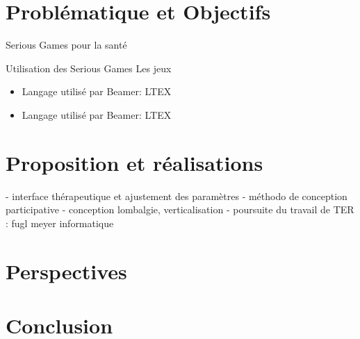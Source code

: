 \documentclass{beamer}
\begin{document}
\section{Problématique et Objectifs}
	\begin{frame}{Serious Games pour la santé}
		\begin{block}{Utilisation des Serious Games}
			Les jeux
		\end{block}				
	\end{frame}

	\begin{frame}
		\begin{itemize}
			\item Langage utilisé par Beamer: L\uncover<2->{A}TEX
			\item Langage utilisé par Beamer: L\only<2->{A}TEX
		\end{itemize}
	\end{frame}
	
\section{Proposition et réalisations}	
	\begin{frame}
		- interface thérapeutique et ajustement des paramètres
	- méthodo de conception participative
		- conception lombalgie, verticalisation
		- poursuite du travail de TER : fugl meyer informatique
	\end{frame}

\section{Perspectives}
	\begin{frame}
	
	\end{frame}

\section{Conclusion}
	\begin{frame}
	
	\end{frame}
\end{document}
